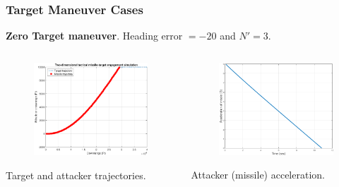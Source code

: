 \documentclass{beamer}
\begin{document}
\begin{frame}
\frametitle{Target Maneuver Cases}

\textbf{Zero Target maneuver}. Heading error $=-20$ and $N'= 3$.
\begin{columns}[c]
	\begin{column}{.45\linewidth}
\begin{figure}[H]
	\centering
	\includegraphics[scale = 0.225]{fig/trajectoryXNT0HE20N3.pdf}
	\label{trajectory20N3}
\end{figure}
		Target and attacker trajectories.
	\end{column}
	\begin{column}{.45\linewidth}
		\begin{figure}[H]
	\centering
	\includegraphics[scale = 0.225]{fig/MissileAccelerationXNT0HE20N3.pdf}
	\label{missile acceleration20N3}
\end{figure}
		Attacker (missile) acceleration.
	\end{column}
\end{columns}
\end{frame}
\end{document}
